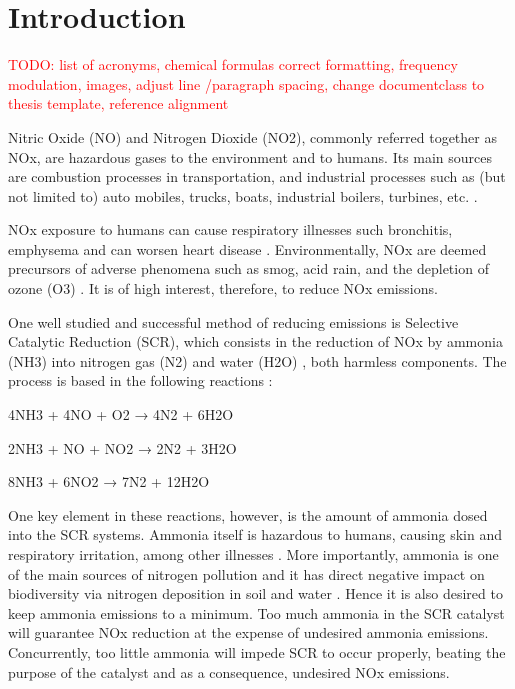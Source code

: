 

\chapter{Introduction}
\label{cha:introduction}

\textcolor{red}{TODO: list of acronyms, chemical formulas correct formatting, frequency modulation, images, adjust line /paragraph spacing, change documentclass to thesis template, reference alignment}

Nitric Oxide (NO) and Nitrogen Dioxide (NO2), commonly referred together as NOx,  are hazardous gases to the environment and to humans. Its main sources are combustion processes in transportation, and industrial processes such as (but not limited to) auto mobiles, trucks, boats, industrial boilers, turbines, etc. \cite{EPA_2019}.

NOx exposure to humans can cause respiratory illnesses such bronchitis, emphysema and can worsen heart disease \cite{Boningari_2016}. Environmentally, NOx are deemed precursors of adverse phenomena such as smog, acid rain, and the depletion of ozone (O3) \cite{Bernabeo_2019}. It is of high interest, therefore, to reduce NOx emissions.

One well studied and successful method of reducing emissions is Selective Catalytic Reduction (SCR), which consists in the reduction of NOx by ammonia (NH3) into nitrogen gas (N2) and water (H2O) \cite{Forzatti_2001}, both harmless components. The process is based in the following reactions \cite{Forzatti_2001}:

4NH3 + 4NO + O2 → 4N2 + 6H2O

2NH3 + NO + NO2 → 2N2 + 3H2O

8NH3 + 6NO2 → 7N2 + 12H2O

One key element in these reactions, however, is the amount of ammonia dosed into the SCR systems. Ammonia itself is hazardous to humans, causing skin and respiratory irritation, among other illnesses \cite{ASTDRA_2004}. More importantly, ammonia is one of the main sources of nitrogen pollution and it has direct negative impact on biodiversity via nitrogen deposition in soil and water \cite{RAND_2018}. Hence it is also desired to keep ammonia emissions to a minimum. Too much ammonia in the SCR catalyst will guarantee NOx reduction at the expense of undesired ammonia emissions. Concurrently, too little ammonia will impede SCR to occur properly, beating the purpose of the catalyst and as a consequence, undesired NOx emissions.

